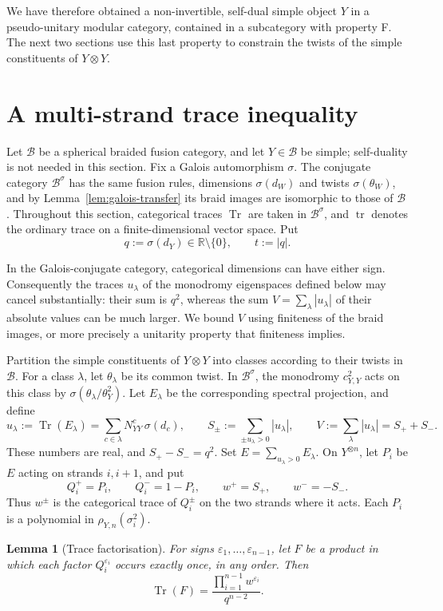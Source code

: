 \documentclass[11pt,oneside]{amsart}
\newtheorem{lemma}[theorem]{Lemma}
\theoremstyle{remark}
\newcommand{\Tr}{\operatorname{Tr}}
\newcommand{\tr}{\operatorname{tr}}
\begin{document}
We have therefore obtained a non-invertible, self-dual simple object $Y$ in a
pseudo-unitary modular category, contained in a subcategory with property F.
The next two sections use this last property to constrain the twists of the
simple constituents of $Y\otimes Y$.

\section{A multi-strand trace inequality}\label{sec:ms}

Let $\mathcal B$ be a spherical braided fusion category, and let
$Y\in\mathcal B$ be simple; self-duality is not needed in this section. Fix a
Galois automorphism $\sigma$. The conjugate category $\mathcal B^\sigma$ has the
same fusion rules, dimensions $\sigma(d_W)$ and twists $\sigma(\theta_W)$, and by
Lemma~\ref{lem:galois-transfer} its braid images are isomorphic to those of
$\mathcal B$. Throughout this section, categorical traces $\Tr$ are taken in
$\mathcal B^\sigma$, and $\tr$ denotes the ordinary trace on a
finite-dimensional vector space. Put
\[
q:=\sigma(d_Y)\in\mathbb R\setminus\{0\},\qquad t:=|q|.
\]

In the Galois-conjugate category, categorical dimensions can have either sign.
Consequently the traces $u_\lambda$ of the monodromy eigenspaces defined below
may cancel substantially: their sum is $q^2$, whereas the sum
$V=\sum_\lambda|u_\lambda|$ of their absolute values can be much larger. We bound
$V$ using finiteness of the braid images, or more precisely a unitarity
property that finiteness implies.

Partition the simple constituents of $Y\otimes Y$ into classes according to their twists
in $\mathcal B$. For a class $\lambda$, let $\theta_\lambda$ be its common
twist. In $\mathcal B^\sigma$, the monodromy $c_{Y,Y}^2$ acts on this class by
$\sigma(\theta_\lambda/\theta_Y^2)$. Let $E_\lambda$ be the corresponding
spectral projection, and define
\[
u_\lambda:=\Tr(E_\lambda)
=\sum_{c\in\lambda}N_{YY}^c\,\sigma(d_c),\qquad
S_\pm:=\sum_{\pm u_\lambda>0}|u_\lambda|,\qquad
V:=\sum_\lambda|u_\lambda|=S_++S_-.
\]
These numbers are real, and $S_+-S_-=q^2$. Set
$E=\sum_{u_\lambda>0}E_\lambda$. On $Y^{\otimes n}$, let $P_i$ be $E$ acting
on strands $i,i+1$, and put
\[
Q_i^+=P_i,\qquad Q_i^-=1-P_i,\qquad
w^+=S_+,\qquad w^-=-S_-.
\]
Thus $w^\pm$ is the categorical trace of $Q_i^\pm$ on the two strands where
it acts. Each $P_i$ is a polynomial in $\rho_{Y,n}(\sigma_i^2)$.

\begin{lemma}[Trace factorisation]\label{lem:fact}
For signs $\varepsilon_1,\ldots,\varepsilon_{n-1}$, let $F$ be a product in
which each factor $Q_i^{\varepsilon_i}$ occurs exactly once, in any order. Then
\[
\Tr(F)=\frac{\prod_{i=1}^{n-1}w^{\varepsilon_i}}{q^{n-2}}.
\]
\end{lemma}
\end{document}

